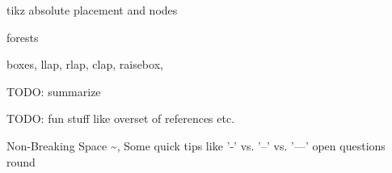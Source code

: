 
\begin{frame}{\insertsection}
   tikz absolute placement and nodes
\end{frame}

\begin{frame}{\insertsection}
   forests
\end{frame}

\begin{frame}{\insertsection}
   boxes, llap, rlap, clap, raisebox,
\end{frame}



\begin{frame}
   TODO: summarize
\end{frame}

\appendix
\begin{frame}
   TODO: fun stuff like overset of references etc.
\end{frame}

\begin{frame}
   Non-Breaking Space \textasciitilde,
   Some quick tips like '-' vs. '--' vs. '---'
   open questions round
\end{frame}

